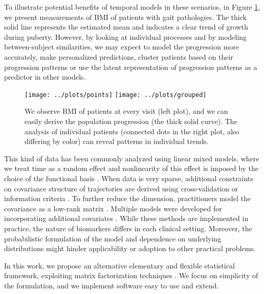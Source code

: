 \documentclass[preprint]{imsart}
\numberwithin{equation}{section}
\theoremstyle{plain}
\begin{document}

To illustrate potential benefits of temporal models in these scenarios, in Figure \ref{fig:motivation}, we present measurements of BMI of patients with gait pathologies. The thick solid line represents the estimated mean and indicates a clear trend of growth during puberty. However, by looking at individual processes and by modeling between-subject similarities, we may expect to model the progression more accurately, make personalized predictions, cluster patients based on their progression patterns or use the latent representation of progression patterns as a predictor in other models. 

\begin{figure}[h]
  \texttt{[image: ../plots/points]}
  \texttt{[image: ../plots/grouped]}
  \caption{We observe BMI of patients at every visit (left plot), and we can easily derive the population progression (the thick solid curve). The analysis of individual patients (connected dots in the right plot, also differing by color) can reveal patterns in individual trends.}
  \label{fig:motivation}
\end{figure}

This kind of data has been commonly analyzed using linear mixed models, where we treat time as a random effect and nonlinearity of this effect is imposed by the choice of the functional basis \citep{zeger1988models, verbeke1997linear, mcculloch2001generalized}. When data is very sparse, additional constraints on covariance structure of trajectories are derived using cross-validation or information criteria \citep{rice2001nonparametric,bigelow2009bayesian}. To further reduce the dimension, practitioners model the covariance as a low-rank matrix \citep{james2000principal,berkey1983longitudinal, yan2017dynamic, hall2006properties, besse1986principal, yao2006penalized, greven2011longitudinal}. Multiple models were developed for incorporating additional covariates \citep{song2002semiparametric, liu2009joint, rizopoulos2014combining}. While these methods are implemented in practice, the nature of biomarkers differs in each clinical setting. Moreover, the probabilistic formulation of the model and dependence on underlying distributions might hinder applicability or adoption to other practical problems.

In this work, we propose an alternative elementary and flexible statistical framework, exploiting matrix factorization techniques \citep{mazumder2010spectral, hastie2015matrix, fazel2002matrix, cai2010singular}. We focus on simplicity of the formulation, and we implement software easy to use and extend. 
\end{document}
